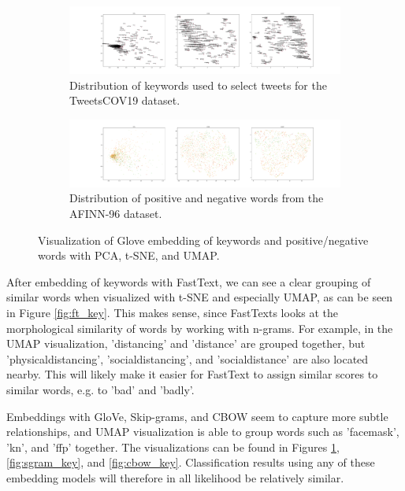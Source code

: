 \begin{figure}
 \centering
 \begin{subfigure}{\columnwidth}
 \includegraphics[width=1\textwidth]{images/keywords_glove.pdf}
 \caption{Distribution of keywords used to select tweets for the TweetsCOV19 dataset.}
 \label{fig:glove_key}
 \end{subfigure}
 \centering
 \begin{subfigure}{\columnwidth}
 \includegraphics[width=1\textwidth]{images/keywords_glove_posneg.pdf}
 \caption{Distribution of positive and negative words from the AFINN-96 dataset.}
  \label{fig:glove_posneg}
 \end{subfigure}
 \caption{Visualization of Glove embedding of keywords and positive/negative words with PCA, t-SNE, and UMAP.}
 \label{fig:glove_viz}
\end{figure}

After embedding of keywords with FastText, we can see a clear grouping of similar words when visualized with t-SNE and especially UMAP, as can be seen in Figure \ref{fig:ft_key}. This makes sense, since FastTexts looks at the morphological similarity of words by working with n-grams. For example, in the UMAP visualization, 'distancing' and 'distance' are grouped together, but 'physicaldistancing', 'socialdistancing', and 'socialdistance' are also located nearby. This will likely make it easier for FastText to assign similar scores to similar words, e.g. to 'bad' and 'badly'.

Embeddings with GloVe, Skip-grams, and CBOW seem to capture more subtle relationships, and UMAP visualization is able to group words such as 'facemask', 'kn', and 'ffp' together. The visualizations can be found in Figures \ref{fig:glove_key}, \ref{fig:sgram_key}, and \ref{fig:cbow_key}. Classification results using any of these embedding models will therefore in all likelihood be relatively similar. 


